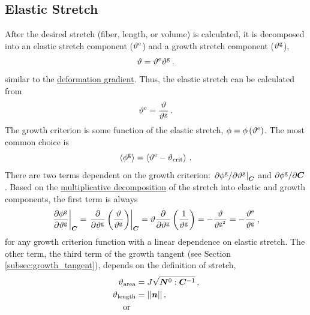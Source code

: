 \documentclass[10pt,letterpaper,oneside]{report}
\newcommand{\ten}[1]{\mbox{\boldmath $#1$}{}}
\newcommand{\scas}[1]{\mbox{{\scriptsize{${\rm{#1}}$}}}{}}
\newcommand{\tens}[1]{\mbox{\boldmath{\scriptsize{$#1$}}}{}}
\begin{document}
\begin{itemize}
\subsection{Elastic Stretch}
After the desired stretch (fiber, length, or volume) is calculated, it is decomposed into an elastic stretch component ($\vartheta^{\scas{e}}$) and a growth stretch component ($\vartheta^{\scas{g}}$), 
\begin{equation}
\vartheta = \vartheta^{\scas{e}} \vartheta^{\scas{g}} \, , 
\end{equation}
similar to the \hyperlink{multiplicative}{deformation gradient}. 
Thus, the elastic stretch can be calculated from
\begin{equation}
\vartheta^{\scas{e}} = \frac{\vartheta}{\vartheta^{\scas{g}}} \, . 
\end{equation}
The growth criterion is some function of the elastic stretch, $\phi =  \phi \left( \vartheta^{\scas{e}} \right)$. The most common choice is
\begin{equation}
\left\langle \phi^{\scas{g}} \right\rangle = \left\langle \vartheta^{\scas{e}} - \vartheta_{\scas{crit}} \right\rangle \, . 
\end{equation}
There are two terms dependent on the growth criterion: $ \left. \partial \phi^{\scas{g}} / \partial \vartheta^{\scas{g}} \right|_{\tens{C}} $ and $ \partial \phi^{\scas{g}} / \partial \ten{C} $.  Based on the \hyperlink{multiplicative}{multiplicative decomposition} of the stretch into elastic and growth components, the first term is always 
\begin{equation}
\left. \frac{\partial \phi^{\scas{g}}}{\partial \vartheta^{\scas{g}}} \right|_{\tens{C}} = \left. \frac{\partial }{\partial \vartheta^{\scas{g}}} \left( \frac{\vartheta}{ \vartheta^{\scas{g}}} \right) \right|_{\tens{C}} = \vartheta \frac{\partial }{\partial \vartheta^{\scas{g}}} \left( \frac{1}{ \vartheta^{\scas{g}}} \right) = - \frac{\vartheta }{ \vartheta^{\scas{g}^2}} = - \frac{\vartheta^{\scas{e}} }{ \vartheta^{\scas{g}}} \, , 
\end{equation}
for any growth criterion function with a linear dependence on elastic stretch.  The other term, the third term of the growth tangent (see Section \ref{subsec:growth_tangent}), depends on the definition of stretch, 
\begin{align}
\vartheta_{\scas{area}} ={}& J \sqrt{ \ten{N}^0 : \ten{C}^{-1} } \, ,  
\\
\vartheta_{\scas{length}} ={}& || \ten{n} || \, , \,   
\\ \mbox{or} \qquad

\end{align}
\end{itemize}
\end{document}
